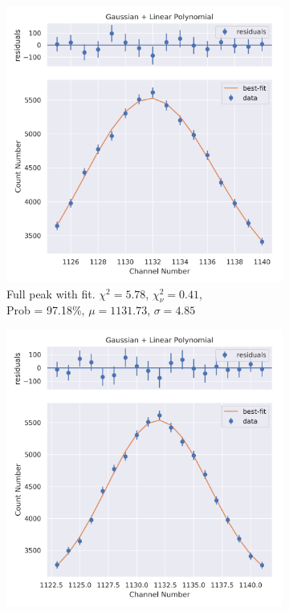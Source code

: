 \documentclass[11pt,a4paper]{article}
\begin{document}
\begin{figure}[H]
  \centering
  \begin{subfigure}{.5\linewidth}
    \centering
    \includegraphics[width=\linewidth]{./Images/Barium133/Linear/Linear_2_Full.png}
    \caption{Full peak with fit. $\chi^2 = 5.78$, $\chi^2_\nu = 0.41$, \\ Prob = 97.18\%, $\mu = 1131.73$, $\sigma = 4.85$}
  \end{subfigure}%
  \begin{subfigure}{.5\linewidth}
    \centering
    \includegraphics[width=\linewidth]{./Images/Barium133/Linear/Linear_2_Zoom.png}

\end{subfigure}
\end{figure}
\end{document}
